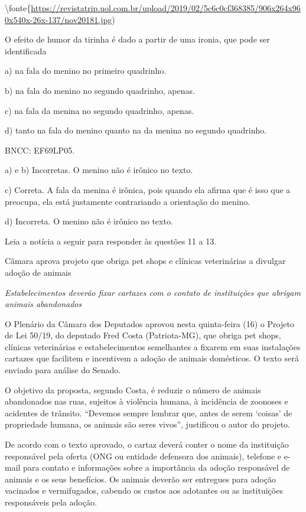 {\textbackslash fonte\{\url{https://revistatrip.uol.com.br/upload/2019/02/5c6c0cf368385/906x264x960x540x-26x-137/nov20181.jpg})

O efeito de humor da tirinha é dado a partir de uma ironia, que pode ser
identificada

a) na fala do menino no primeiro quadrinho.

b) na fala do menino no segundo quadrinho, apenas.

c) na fala da menina no segundo quadrinho, apenas.

d) tanto na fala do menino quanto na da menina no segundo quadrinho.

BNCC: EF69LP05.

a) e b) Incorretas. O menino não é irônico no texto.

c) Correta. A fala da menina é irônica, pois quando ela afirma que é
isso que a preocupa, ela está justamente contrariando a orientação do
menino.

d) Incorreta. O menino não é irônico no texto.

Leia a notícia a seguir para responder às questões 11 a 13.

Câmara aprova projeto que obriga pet shops e clínicas veterinárias a
divulgar adoção de animais

\emph{Estabelecimentos deverão fixar cartazes com o contato de
instituições que abrigam animais abandonados}

O Plenário da Câmara dos Deputados aprovou nesta quinta-feira (16) o
Projeto de Lei 50/19, do deputado Fred Costa (Patriota-MG), que obriga
pet shops, clínicas veterinárias e estabelecimentos semelhantes a
fixarem em suas instalações cartazes que facilitem e incentivem a adoção
de animais domésticos. O texto será enviado para análise do Senado.

O objetivo da proposta, segundo Costa, é reduzir o número de animais
abandonados nas ruas, sujeitos à violência humana, à incidência de
zoonoses e acidentes de trânsito. ``Devemos sempre lembrar que, antes de
serem `coisas' de propriedade humana, os animais são seres vivos'',
justificou o autor do projeto.

De acordo com o texto aprovado, o cartaz deverá conter o nome da
instituição responsável pela oferta (ONG ou entidade defensora dos
animais), telefone e e-mail para contato e informações sobre a
importância da adoção responsável de animais e os seus benefícios. Os
animais deverão ser entregues para adoção vacinados e vermifugados,
cabendo os custos aos adotantes ou as instituições responsáveis pela
adoção.

}

